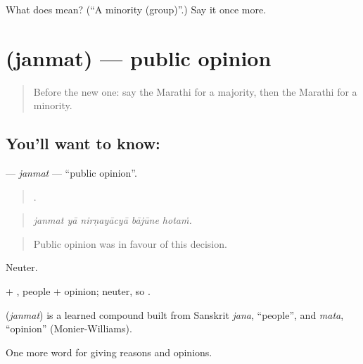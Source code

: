 \begin{tcolorbox}[breakable,colback=teal!4,colframe=teal!35!black,title={Before you move on}]
What does  mean? (\textquotedblleft{}A minority (group)\textquotedblright{}.) Say it once more.
\end{tcolorbox}
\section[\texorpdfstring{\mr{जनमत} (janmat)}{जनमत (janmat)}]{ (janmat) — public opinion}

\label{lesson:MR-C356-janmat}



\begin{quote}
Before the new one: say the Marathi for a majority, then the Marathi for a minority.
\end{quote}

\subsection*{You'll want to know: }
\textbf{} — \emph{janmat} — \textquotedblleft{}public opinion\textquotedblright{}.

\begin{quote}
    .
\end{quote}

\begin{quote}
\emph{janmat yā nirṇayācyā bājūne hotaṁ.}
\end{quote}

\begin{quote}
Public opinion was in favour of this decision.
\end{quote}

Neuter.

 + , people + opinion; neuter, so .

\begin{cousinweb}
\textbf{} (\emph{janmat}) is a learned compound built from Sanskrit \emph{jana}, \textquotedblleft{}people\textquotedblright{}, and \emph{mata}, \textquotedblleft{}opinion\textquotedblright{} (Monier-Williams).
\end{cousinweb}

\begin{grammarlens}[title={What you've built}]
One more word for giving reasons and opinions.
\end{grammarlens}

